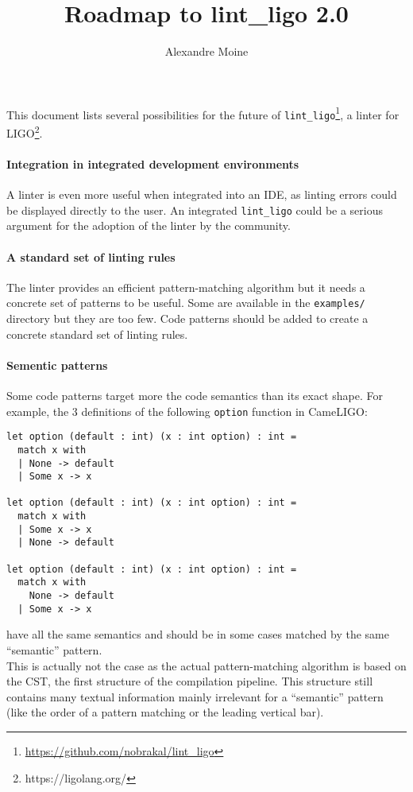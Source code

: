 \documentclass[10pt,a4paper]{article}
\author{Alexandre Moine}
\title{Roadmap to lint\_ligo 2.0}
\begin{document}
\maketitle

This document lists several possibilities for the future of \verb|lint_ligo|\footnote{\url{https://github.com/nobrakal/lint_ligo}}, a linter for LIGO\footnote{https://ligolang.org/}.

\paragraph{Integration in integrated development environments}
A linter is even more useful when integrated into an IDE, as linting errors could be displayed directly to the user.
An integrated \verb|lint_ligo| could be a serious argument for the adoption of the linter by the community.

\paragraph{A standard set of linting rules}

The linter provides an efficient pattern-matching algorithm but it needs a concrete set of patterns to be useful. Some are available in the \verb|examples/| directory but they are too few. Code patterns should be added to create a concrete standard set of linting rules.

\paragraph{Sementic patterns}
Some code patterns target more the code semantics than its exact shape. For example, the 3 definitions of the following \verb|option| function in CameLIGO:
\begin{verbatim}
let option (default : int) (x : int option) : int =
  match x with
  | None -> default
  | Some x -> x

let option (default : int) (x : int option) : int =
  match x with
  | Some x -> x
  | None -> default

let option (default : int) (x : int option) : int =
  match x with
    None -> default
  | Some x -> x
\end{verbatim}

have all the same semantics and should be in some cases matched by the same ``semantic'' pattern.\\
This is actually not the case as the actual pattern-matching algorithm is based on the CST, the first structure of the compilation pipeline. This structure still contains many textual information mainly irrelevant for a ``semantic'' pattern (like the order of a pattern matching or the leading vertical bar).
\end{document}
